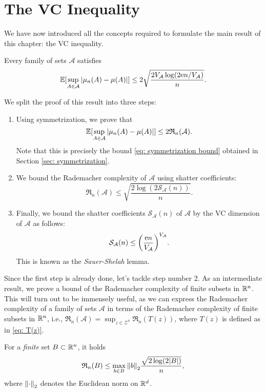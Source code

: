 \section{The VC Inequality}
\label{sec: VC inequality}

We have now introduced all the concepts required to formulate the main result of this chapter: the VC inequality.

\begin{theorem}[VC Inequality]
Every family of sets $\mathcal{A}$ satisfies
\[
    \operatorname{\mathbb{E}}[\sup_{A \in \mathcal{A}} \abs{\mu_n(A) - \mu(A)}] \leq 2 \sqrt{\frac{2 V_{\mathcal{A}} \log(2\mathrm{e} n / V_{\mathcal{A}})}{n}}.
\]
\end{theorem}

We split the proof of this result into three steps:

\begin{enumerate}
    \item Using symmetrization, we prove that
    \[
        \operatorname{\mathbb{E}}[\sup_{A \in \mathcal{A}} \abs{\mu_n(A) - \mu(A)}] \leq 2 \mathfrak{R}_n(\mathcal{A}).
    \]
    Note that this is precisely the bound \eqref{eq: symmetrization bound} obtained in Section \ref{sec: symmetrization}.

    \item We bound the Rademacher complexity of $\mathcal{A}$ using shatter coefficients:
    \[
        \mathfrak{R}_n(\mathcal{A}) \leq \sqrt{\frac{2 \log(2 \mathcal{S}_{\mathcal{A}}(n))}{n}}.
    \]

    \item Finally, we bound the shatter coefficients $\mathcal{S}_{\mathcal{A}}(n)$ of $\mathcal{A}$ by the VC dimension of $\mathcal{A}$ as follows:
    \[
        \mathcal{S}_{\mathcal{A}}(n) \leq \left(\frac{\e n}{V_{\mathcal{A}}}\right)^{V_{\mathcal{A}}}.
    \]
    This is known as the \emph{Sauer-Shelah} lemma.
\end{enumerate}

Since the first step is already done, let's tackle step number 2. As an intermediate result, we prove a bound of the Rademacher complexity of finite subsets in $\mathbb{R}^n$. This will turn out to be immensely useful, as we can express the Rademacher complexity of a family of sets $\mathcal{A}$ in terms of the Rademacher complexity of finite subsets in $\mathbb{R}^n$, i.e., $\mathfrak{R}_n(\mathcal{A}) = \sup_{z \in \mathcal{Z}^n} \mathfrak{R}_n(T(z))$, where $T(z)$ is defined as in \eqref{eq: T(z)}.

\begin{lemma}
\label{lem: bound on rademacher complexity of finite set}
For a \emph{finite} set $B \subset \mathbb{R}^n$, it holds
\[
    \mathfrak{R}_n(B) \leq \max_{b \in B} \norm{b}_2 \frac{\sqrt{2 \log(2 \abs{B})}}{n},
\]
where $\norm{\cdot}_2$ denotes the Euclidean norm on $\mathbb{R}^d$.
\end{lemma}

